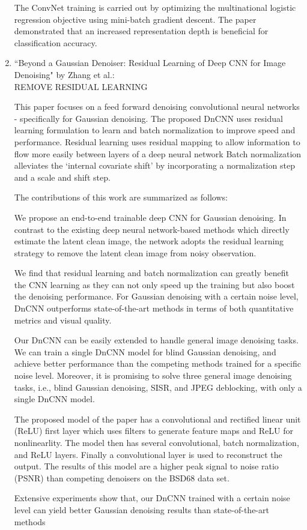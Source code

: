 \documentclass[12pt, titlepage]{article}
\begin{document}
\begin{enumerate}
	The ConvNet training is carried out by optimizing the multinational logistic regression objective using mini-batch gradient descent. The paper demonstrated that an increased representation depth is beneficial for classification accuracy.
	
	\item ``Beyond a Gaussian Denoiser: Residual Learning of Deep CNN for Image Denoising" by Zhang et al.\citep{zhang2017beyond}:\\
	
	REMOVE RESIDUAL LEARNING
	
	This paper focuses on a feed forward denoising convolutional neural networks - specifically for Gaussian denoising. The proposed DnCNN uses residual learning formulation to learn and batch normalization to improve speed and performance. Residual learning uses residual mapping to allow information to flow more easily between layers of a deep neural network
	Batch normalization alleviates the `internal covariate shift' by incorporating a normalization step and a scale and shift step.
	
	The contributions of this work are summarized as follows:
	
	We propose an end-to-end trainable deep CNN for Gaussian denoising. In contrast to the existing deep neural network-based methods which directly estimate the latent clean image, the network adopts the residual learning strategy to remove the latent clean image from noisy observation.
	
	We find that residual learning and batch normalization can greatly benefit the CNN learning as they can not only speed up the training but also boost the denoising performance. For Gaussian denoising with a certain noise level, DnCNN outperforms state-of-the-art methods in terms of both quantitative metrics and visual quality.
	
	Our DnCNN can be easily extended to handle general image denoising tasks. We can train a single DnCNN model for blind Gaussian denoising, and achieve better performance than the competing methods trained for a specific noise level. Moreover, it is promising to solve three general image denoising tasks, i.e., blind Gaussian denoising, SISR, and JPEG deblocking, with only a single DnCNN model.
	
	 The proposed model of the paper has a convolutional and rectified linear unit (ReLU) first layer which uses filters to generate feature maps and ReLU for nonlinearlity. The model then has several convolutional, batch normalization, and ReLU layers. Finally a convolutional layer is used to reconstruct the output. The results of this model are a higher peak signal to noise ratio (PSNR) than competing denoisers on the BSD68 data set. 
	
	Extensive experiments show that, our DnCNN trained with a certain noise level can yield better Gaussian denoising results than state-of-the-art methods 
\end{enumerate}
\end{document}
